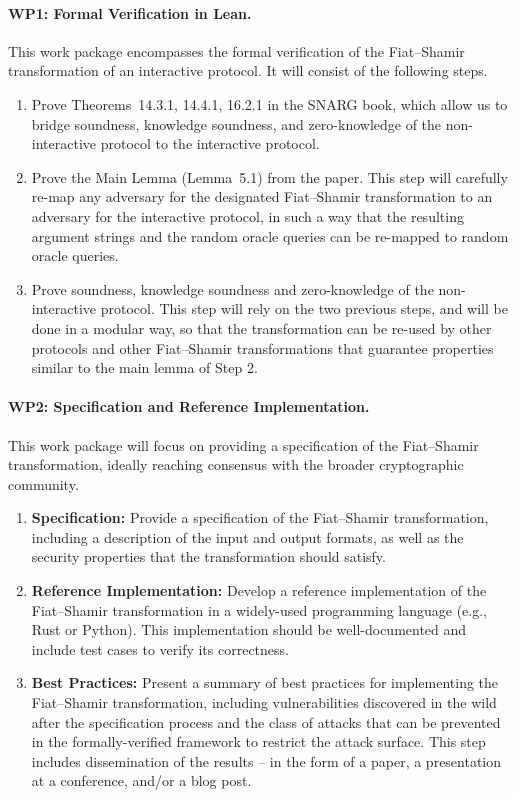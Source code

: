 \documentclass{article}
\begin{document}
\paragraph{WP1: Formal Verification in Lean.}
This work package encompasses the formal verification of the Fiat--Shamir transformation of an interactive protocol. It will consist of the following steps.
\begin{enumerate}[label=\textbf{Step \arabic*:}, leftmargin=*, itemsep=0.5em]
    \item Prove Theorems~14.3.1, 14.4.1, 16.2.1 in the SNARG book, which allow us to bridge soundness, knowledge soundness, and zero-knowledge of the non-interactive protocol to the interactive protocol.
    \item Prove the Main Lemma (Lemma~5.1) from the paper. This step will carefully re-map any adversary for the designated Fiat--Shamir transformation to an adversary for the interactive protocol, in such a way that the resulting argument strings and the random oracle queries can be re-mapped to random oracle queries.
    \item Prove soundness, knowledge soundness and zero-knowledge of the non-interactive protocol. This step will rely on the two previous steps, and will be done in a modular way, so that the transformation can be re-used by other protocols and other Fiat--Shamir transformations that guarantee properties similar to the main lemma of Step 2.
\end{enumerate}
\paragraph{WP2: Specification and Reference Implementation. }
This work package will focus on providing a specification of the Fiat--Shamir transformation, ideally reaching consensus with the broader cryptographic community.
\begin{enumerate}[label=\textbf{Step \arabic*:}, leftmargin=*, itemsep=0.5em]

    \item \textbf{Specification:} Provide a specification of the Fiat--Shamir transformation, including a description of the input and output formats, as well as the security properties that the transformation should satisfy.
    \item \textbf{Reference Implementation:} Develop a reference implementation of the Fiat--Shamir transformation in a widely-used programming language (e.g., Rust or Python). This implementation should be well-documented and include test cases to verify its correctness.
    \item \textbf{Best Practices:} Present a summary of best practices for implementing the Fiat--Shamir transformation, including vulnerabilities discovered in the wild after the specification process and the class of attacks that can be prevented in the formally-verified framework to restrict the attack surface. This step includes dissemination of the results  -- in the form of a paper, a presentation at a conference, and/or a blog post.
\end{enumerate}
\end{document}
